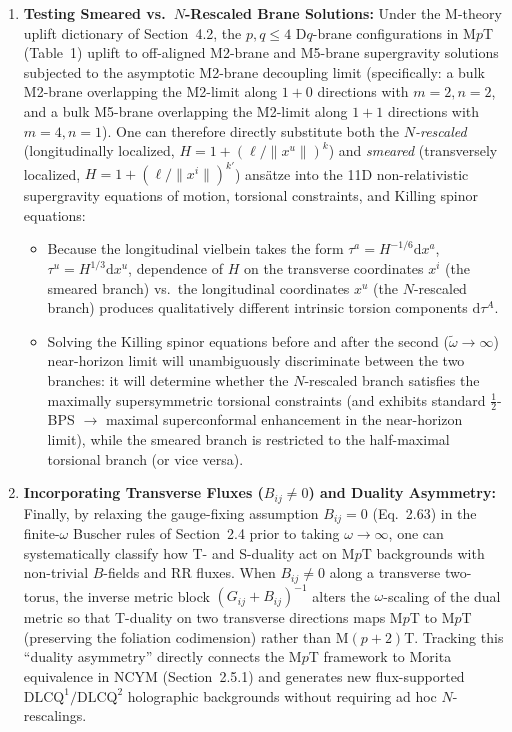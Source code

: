 \documentclass[11pt,a4paper]{article}
\newcommand{\dd}{\mathrm{d}}
\begin{document}
\begin{enumerate}[label=(\roman*), leftmargin=1.8em]
    \item \textbf{Testing Smeared vs.\ $N$-Rescaled Brane Solutions:}
    Under the M-theory uplift dictionary of Section~4.2, the $p,q \le 4$ D$q$-brane configurations in M$p$T (Table~1) uplift to off-aligned M2-brane and M5-brane supergravity solutions subjected to the asymptotic M2-brane decoupling limit (specifically: a bulk M2-brane overlapping the M2-limit along $1+0$ directions with $m=2, n=2$, and a bulk M5-brane overlapping the M2-limit along $1+1$ directions with $m=4, n=1$). One can therefore directly substitute both the \emph{$N$-rescaled} (longitudinally localized, $H = 1 + (\ell/\|x^u\|)^k$) and \emph{smeared} (transversely localized, $H = 1 + (\boldsymbol{\ell}/\|x^i\|)^{k'}$) ansätze into the 11D non-relativistic supergravity equations of motion, torsional constraints, and Killing spinor equations:
    \begin{itemize}[nosep]
        \item Because the longitudinal vielbein takes the form $\tau^a = H^{-1/6}\dd x^a$, $\tau^u = H^{1/3}\dd x^u$, dependence of $H$ on the transverse coordinates $x^i$ (the smeared branch) vs.\ the longitudinal coordinates $x^u$ (the $N$-rescaled branch) produces qualitatively different intrinsic torsion components $\dd\tau^A$.
        \item Solving the Killing spinor equations before and after the second ($\tilde{\omega} \to \infty$) near-horizon limit will unambiguously discriminate between the two branches: it will determine whether the $N$-rescaled branch satisfies the maximally supersymmetric torsional constraints (and exhibits standard $\frac{1}{2}$-BPS $\to$ maximal superconformal enhancement in the near-horizon limit), while the smeared branch is restricted to the half-maximal torsional branch (or vice versa).
    \end{itemize}

    \item \textbf{Incorporating Transverse Fluxes ($B_{ij} \neq 0$) and Duality Asymmetry:}
    Finally, by relaxing the gauge-fixing assumption $B_{ij} = 0$ (Eq.~2.63) in the finite-$\omega$ Buscher rules of Section~2.4 prior to taking $\omega \to \infty$, one can systematically classify how T- and S-duality act on M$p$T backgrounds with non-trivial $B$-fields and RR fluxes. When $B_{ij} \neq 0$ along a transverse two-torus, the inverse metric block $(G_{ij} + B_{ij})^{-1}$ alters the $\omega$-scaling of the dual metric so that T-duality on two transverse directions maps M$p$T to M$p$T (preserving the foliation codimension) rather than M$(p+2)$T. Tracking this ``duality asymmetry'' directly connects the M$p$T framework to Morita equivalence in NCYM (Section~2.5.1) and generates new flux-supported $\text{DLCQ}^1/\text{DLCQ}^2$ holographic backgrounds without requiring ad hoc $N$-rescalings.
\end{enumerate}
\end{document}
